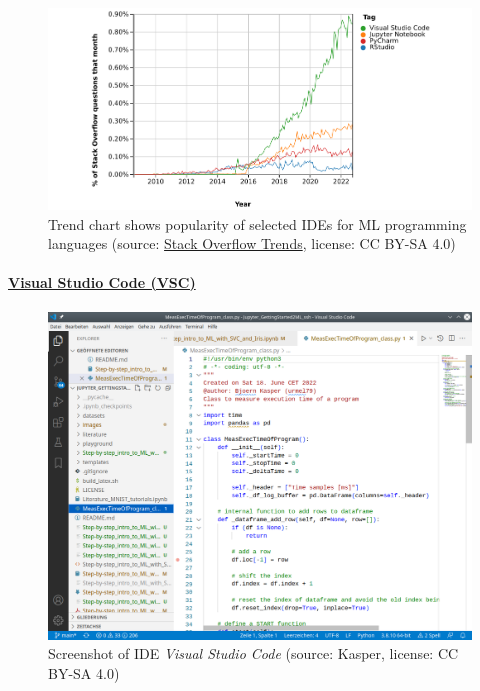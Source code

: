 \documentclass [oneside,10pt,a4paper,ngerman,BCOR10mm,headsepline,parindent,final]{scrartcl}
\begin{document}
\begin{figure}
\centering
\includegraphics{images/2022-11-11_StackOverflowTrends_IDEs_wide.png}
\caption{Trend chart shows popularity of selected IDEs for ML
programming languages (source:
\href{https://insights.stackoverflow.com/trends?tags=rstudio\%2Cjupyter-notebook\%2Cvisual-studio-code\%2Cpycharm}{Stack
Overflow Trends}, license: CC BY-SA 4.0)}
\end{figure}

    \hypertarget{visual-studio-code-vsc}{%
\paragraph{\texorpdfstring{\href{https://en.wikipedia.org/wiki/Visual_Studio_Code}{Visual
Studio Code
(VSC)}}{Visual Studio Code (VSC)}}\label{visual-studio-code-vsc}}

\begin{figure}
\centering
\includegraphics{images/Screenshot_VSC.png}
\caption{Screenshot of IDE \emph{Visual Studio Code} (source: Kasper,
license: CC BY-SA 4.0)}
\end{figure}
\end{document}
